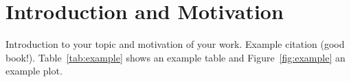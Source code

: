 \chapter{Introduction and Motivation}\label{chap:introduction}

Introduction to your topic and motivation of your work.
Example citation \cite{bishopPatternRecognitionMachine2006} (good book!).
Table~\ref{tab:example} shows an example table and Figure~\ref{fig:example} an
example plot.





